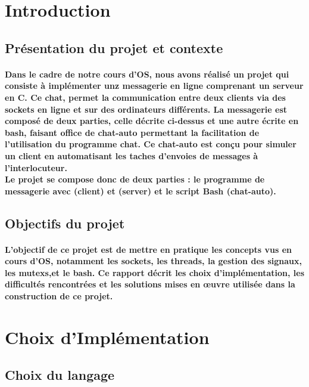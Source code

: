 \documentclass[utf8]{article}
\begin{document}
\newpage
\tableofcontents

\newpage



\section{Introduction}
\subsection{Présentation du projet et contexte}
\paragraph{Dans le cadre de notre cours d'OS, nous avons réalisé un projet qui consiste à implémenter unz messagerie en ligne comprenant un serveur en C.
Ce chat, permet la communication entre deux clients via des sockets en ligne et sur des ordinateurs différents. La messagerie est composé de deux parties, celle décrite ci-dessus et une autre écrite en bash,
faisant office de chat-auto permettant la facilitation de l'utilisation du programme chat. Ce chat-auto est conçu pour simuler un client en automatisant les taches d'envoies de messages à l'interlocuteur.\\
Le projet se compose donc de deux parties : le programme de messagerie avec (client) et (server) et le script Bash (chat-auto).}

\subsection{Objectifs du projet}
\paragraph{L'objectif de ce projet est de mettre en pratique les concepts vus en cours d'OS, notamment les sockets, les threads, la gestion
des signaux, les mutexs,et le bash. 
Ce rapport décrit les choix d'implémentation, les difficultés rencontrées et les solutions mises en œuvre utilisée dans la 
construction de ce projet.}

\section{Choix d’Implémentation}
\subsection{Choix du langage}
\end{document}
